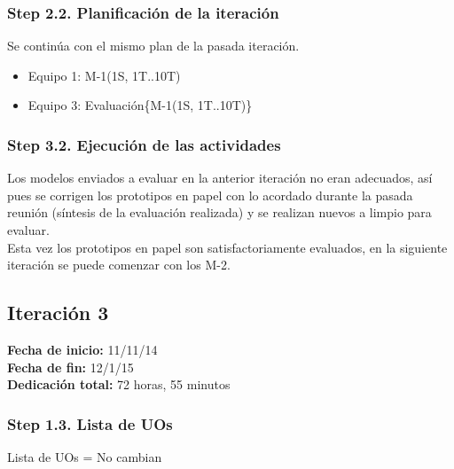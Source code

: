\subsubsection{Step 2.2. Planificación de la iteración}
\label{it2:2.2}

Se continúa con el mismo plan de la pasada iteración.

\begin{itemize}
\item Equipo 1: M-1(1S, 1T..10T)
\item Equipo 3: Evaluación\{M-1(1S, 1T..10T)\}
\end{itemize}

\subsubsection{Step 3.2. Ejecución de las actividades}
\label{it2:3.2}

Los modelos enviados a evaluar en la anterior iteración no eran adecuados, así pues se corrigen los prototipos en papel con lo acordado durante la pasada reunión (síntesis de la evaluación realizada) y se realizan nuevos a limpio para evaluar.\\

Esta vez los prototipos en papel son satisfactoriamente evaluados, en la siguiente iteración se puede comenzar con los M-2.\\


\subsection{Iteración 3}
\label{it3}

\begin{flushleft}
\textbf{Fecha de inicio:} 11/11/14\\
\textbf{Fecha de fin:} 12/1/15\\
\textbf{Dedicación total:} 72 horas, 55 minutos\\
\end{flushleft}

\subsubsection{Step 1.3. Lista de UOs}
\label{it3:1.3}

Lista de UOs = No cambian

